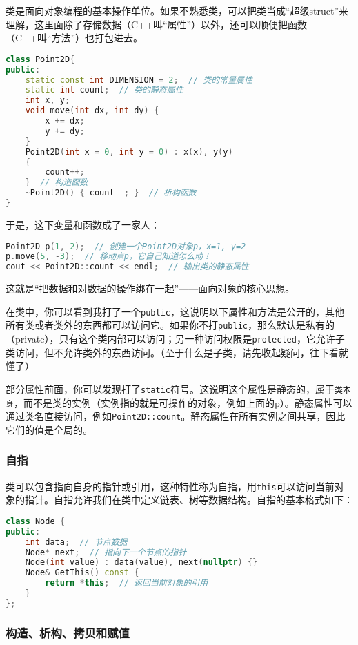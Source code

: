 \documentclass[../main.tex]{subfiles}
\begin{document}
类是面向对象编程的基本操作单位。如果不熟悉类，可以把类当成“超级struct”来理解，这里面除了存储数据（C++叫“属性”）以外，还可以顺便把函数（C++叫“方法”）也打包进去。
\begin{lstlisting}[language=C++]
class Point2D{
public:
    static const int DIMENSION = 2;  // 类的常量属性
    static int count;  // 类的静态属性
    int x, y;
    void move(int dx, int dy) {
        x += dx;
        y += dy;
    }
    Point2D(int x = 0, int y = 0) : x(x), y(y)
    {
        count++;
    }  // 构造函数
    ~Point2D() { count--; }  // 析构函数
}
\end{lstlisting}
于是，这下变量和函数成了一家人：
\begin{lstlisting}[language=C++]
Point2D p(1, 2);  // 创建一个Point2D对象p，x=1, y=2
p.move(5, -3);  // 移动点p，它自己知道怎么动！
cout << Point2D::count << endl;  // 输出类的静态属性
\end{lstlisting}
这就是“把数据和对数据的操作绑在一起”——面向对象的核心思想。

在类中，你可以看到我打了一个\texttt{public}，这说明以下属性和方法是公开的，其他所有类或者类外的东西都可以访问它。如果你不打\texttt{public}，那么默认是私有的（private），只有这个类内部可以访问；另一种访问权限是\texttt{protected}，它允许子类访问，但不允许类外的东西访问。（至于什么是子类，请先收起疑问，往下看就懂了）

部分属性前面，你可以发现打了\texttt{static}符号。这说明这个属性是静态的，属于\texttt{类本身}，而不是类的实例（实例指的就是可操作的对象，例如上面的p）。静态属性可以通过类名直接访问，例如\texttt{Point2D::count}。静态属性在所有实例之间共享，因此它们的值是全局的。

\subsubsection{自指}

类可以包含指向自身的指针或引用，这种特性称为自指，用\texttt{this}可以访问当前对象的指针。自指允许我们在类中定义链表、树等数据结构。自指的基本格式如下：
\begin{lstlisting}[language=C++]
class Node {
public:
    int data;  // 节点数据
    Node* next;  // 指向下一个节点的指针
    Node(int value) : data(value), next(nullptr) {}
    Node& GetThis() const {
        return *this;  // 返回当前对象的引用
    }
};
\end{lstlisting}

\subsubsection{构造、析构、拷贝和赋值}
\end{document}
